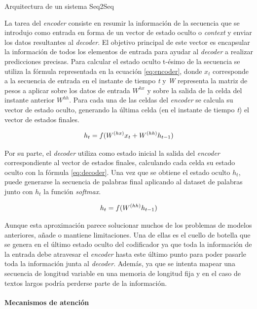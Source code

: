 %
{Arquitectura de un sistema Seq2Seq}

La tarea del \textit{encoder} consiste en resumir la información de la secuencia que se introdujo como entrada en forma de un vector de estado oculto o \textit{context} y enviar los datos resultantes al \textit{decoder}. El objetivo principal de este vector es encapsular la información de todos los elementos de entrada para ayudar al \textit{decoder} a realizar predicciones precisas. Para calcular el estado oculto t-ésimo de la secuencia se utiliza la fórmula representada en la ecuación \ref{eq:encoder}, donde  $x_t$ corresponde a la secuencia de entrada en el instante de tiempo \textit{t} y \textit{W} representa la matriz de pesos a aplicar sobre los datos de entrada $W^{hx}$ y sobre la salida de la celda del instante anterior $W^{hh}$. Para cada una de las celdas del \textit{encoder} se calcula su vector de estado oculto, generando la última celda (en el instante de tiempo \textit{t}) el vector de estados finales.

\begin{equation}
	\label{eq:encoder}
	\Large
	h_t = f(W^{(hx)}x_t+W^{(hh)}h_{t-1})
\end{equation}


Por su parte, el \textit{decoder} utiliza como estado inicial la salida del \textit{encoder} correspondiente al vector de estados finales, calculando cada celda su estado oculto con la fórmula \ref{eq:decoder}. Una vez que se obtiene el estado oculto $h_{t}$, puede generarse la secuencia de palabras final aplicando al dataset de palabras junto con $h_{t}$ la función \textit{softmax}.

\begin{equation}
	\label{eq:decoder}
	\Large
	h_t = f(W^{(hh)}h_{t-1})
\end{equation}

Aunque esta aproximación parece solucionar muchos de los problemas de modelos anteriores, añade o mantiene limitaciones. Una de ellas es el cuello de botella que se genera en el último estado oculto del codificador ya que toda la información de la entrada debe atravesar el \textit{encoder} hasta este último punto para poder pasarle toda la información junta al \textit{decoder}. Además, ya que se intenta mapear una secuencia de longitud variable en una memoria de longitud fija y en el caso de textos largos podría perderse parte de la información. 


\paragraph{Mecanismos de atención}\hfill

